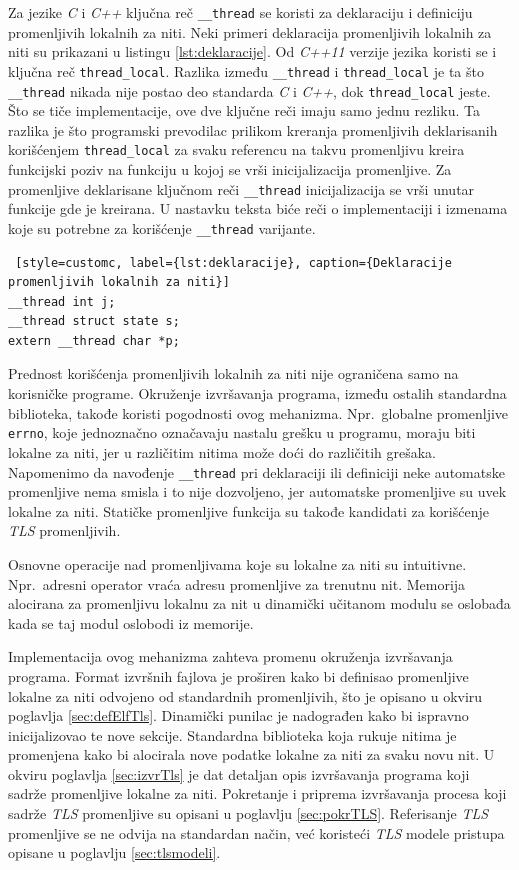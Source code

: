 \documentclass[12pt,oneside]{memoir}
\begin{document}
Za jezike \emph{C} i \emph{C++} ključna reč \texttt{\_\_thread} se koristi za deklaraciju i definiciju promenljivih lokalnih za niti. Neki primeri deklaracija promenljivih lokalnih za niti su prikazani u listingu \ref{lst:deklaracije}. Od \emph{C++11} verzije jezika koristi se i ključna reč \texttt{thread\_local}. Razlika između \texttt{\_\_thread} i \texttt{thread\_local} je ta što \texttt{\_\_thread} nikada nije postao deo standarda \emph{C} i \emph{C++}, dok \texttt{thread\_local} jeste. Što se tiče implementacije, ove dve ključne reči imaju samo jednu rezliku. Ta razlika je što programski prevodilac prilikom kreranja promenljivih deklarisanih korišćenjem \texttt{thread\_local} za svaku referencu na takvu promenljivu kreira funkcijski poziv na funkciju u kojoj se vrši inicijalizacija promenljive. Za promenljive deklarisane ključnom reči \texttt{\_\_thread} inicijalizacija se vrši unutar funkcije gde je kreirana. U nastavku teksta biće reči o implementaciji i izmenama koje su potrebne za korišćenje \texttt{\_\_thread} varijante.

\begin{lstlisting} [style=customc, label={lst:deklaracije}, caption={Deklaracije promenljivih lokalnih za niti}]
__thread int j;
__thread struct state s;
extern __thread char *p;
\end{lstlisting}

Prednost korišćenja promenljivih lokalnih za niti nije ograničena samo na korisničke programe. Okruženje izvršavanja programa, između ostalih standardna biblioteka, takođe koristi pogodnosti ovog mehanizma. Npr.~globalne promenljive \texttt{errno}, koje jednoznačno označavaju nastalu grešku u programu, moraju biti lokalne za niti, jer u različitim nitima može doći do različitih grešaka. Napomenimo da navođenje \texttt{\_\_thread} pri deklaraciji ili definiciji neke automatske promenljive nema smisla i to nije dozvoljeno, jer automatske promenljive su uvek lokalne za niti.  Statičke promenljive funkcija su takođe kandidati za korišćenje \emph{TLS} promenljivih.

Osnovne operacije nad promenljivama koje su lokalne za niti su intuitivne. Npr.~adresni operator vraća adresu promenljive za trenutnu nit. Memorija alocirana za promenljivu lokalnu za nit u dinamički učitanom modulu se oslobađa kada se taj modul oslobodi iz memorije.

Implementacija ovog mehanizma zahteva promenu okruženja izvršavanja programa. Format izvršnih fajlova je proširen kako bi definisao promenljive lokalne za niti odvojeno od standardnih promenljivih, što je opisano u okviru poglavlja \ref{sec:defElfTls}. Dinamički punilac je nadograđen kako bi ispravno inicijalizovao te nove sekcije. Standardna biblioteka koja rukuje nitima je promenjena kako bi alocirala nove podatke lokalne za niti za svaku novu nit. U okviru poglavlja \ref{sec:izvrTls} je dat detaljan opis izvršavanja programa koji sadrže promenljive lokalne za niti. Pokretanje i priprema izvršavanja procesa koji sadrže \emph{TLS} promenljive su opisani u poglavlju \ref{sec:pokrTLS}. Referisanje \emph{TLS} promenljive se ne odvija na standardan način, već koristeći \emph{TLS} modele pristupa opisane u poglavlju \ref{sec:tlsmodeli}.
\end{document}
